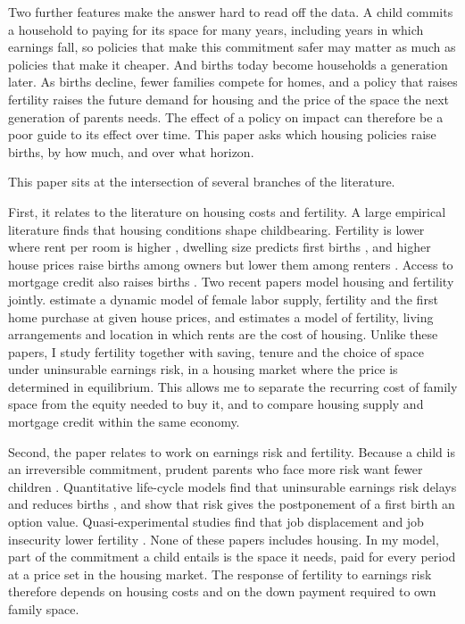 Two further features make the answer hard to read off the data. A child
commits a household to paying for its space for many years, including years
in which earnings fall, so policies that make this commitment safer may
matter as much as policies that make it cheaper. And births today become
households a generation later. As births decline, fewer families compete for
homes, and a policy that raises fertility raises the future demand for
housing and the price of the space the next generation of parents needs. The
effect of a policy on impact can therefore be a poor guide to its effect over
time. This paper asks which housing policies raise births, by how much, and
over what horizon.


This paper sits at the intersection of several branches of the literature.

First, it relates to the literature on housing costs and fertility. A large
empirical literature finds that housing conditions shape childbearing.
Fertility is lower where rent per room is higher
\citep{simonTamuraHigherRents2009}, dwelling size predicts first births
\citep{stromHousingFirstBirths2010}, and higher house prices raise births
among owners but lower them among renters
\citep{dettlingHousePricesBirth2014,lovenheimFamilyWealthShocks2013}. Access
to mortgage credit also raises births
\citep{hacamoBabiesMortgageDeregulation2021,cummingMonetaryPolicyBirth2024,dettlingKearneyModernMortgage2025,vandoornikFazioRamadoraiSkrastinsHousingFertility2025}.
Two recent papers model housing and fertility jointly.
\citet{khorunzhinaMillerAmericanDream2022} estimate a dynamic model of female
labor supply, fertility and the first home purchase at given house prices,
and \citet{couillardBuildBabyBuild2025} estimates a model of fertility,
living arrangements and location in which rents are the cost of housing.
Unlike these papers, I study fertility together with saving, tenure and the
choice of space under uninsurable earnings risk, in a housing market where
the price is determined in equilibrium. This allows me to separate the
recurring cost of family space from the equity needed to buy it, and to
compare housing supply and mortgage credit within the same economy.

Second, the paper relates to work on earnings risk and fertility. Because a
child is an irreversible commitment, prudent parents who face more risk want
fewer children \citep{fraserIncomeRisk2001}. Quantitative life-cycle models
find that uninsurable earnings risk delays and reduces births
\citep{sommerFertilityChoiceLife2016,ejrnaesJorgensenFamilyPlanning2020,nakakuniFertilityIncomeUncertainty2026},
and \citet{deLaCroixPommeretChildbearing2021} show that risk gives the
postponement of a first birth an option value. Quasi-experimental studies
find that job displacement and job insecurity lower fertility
\citep{delBonoWeberWinterEbmer2012,clarkLepinteurJobInsecurity2022}. None of
these papers includes housing. In my model, part of the commitment a child
entails is the space it needs, paid for every period at a price set in the
housing market. The response of fertility to earnings risk therefore depends
on housing costs and on the down payment required to own family space.

